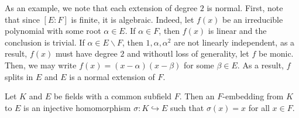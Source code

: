As an example, we note that each extension of degree $2$ is normal. First, note that since $[E:F]$ is finite, it is algebraic. Indeed, let $f(x)$ be an irreducible polynomial with some root $\alpha\in E$. If $\alpha\in F$, then $f(x)$ is linear and the conclusion is trivial. If $\alpha\in E\backslash F$, then $1,\alpha,\alpha^2$ are not linearly independent, as a result, $f(x)$ must have degree $2$ and withoutl loss of generality, let $f$ be monic. Then, we may write $f(x) = (x - \alpha)(x - \beta)$ for some $\beta\in E$. As a result, $f$ splits in $E$ and $E$ is a normal extension of $F$.

\begin{definition}[$F$-embedding]
    Let $K$ and $E$ be fields with a common subfield $F$. Then an $F$-embedding from $K$ to $E$ is an injective homomorphism $\sigma:K\hookrightarrow E$ such that $\sigma(x) = x$ for all $x\in F$.
\end{definition}

